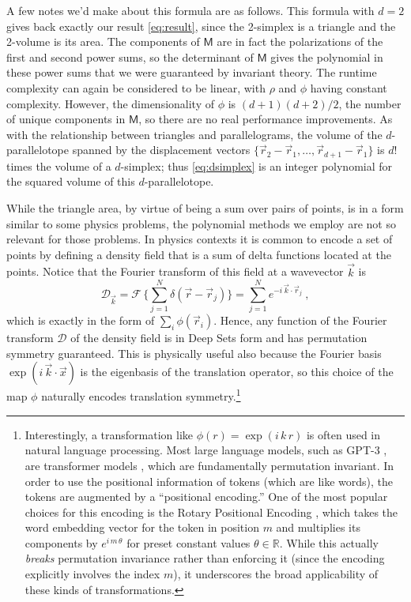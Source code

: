 \documentclass[10pt]{article}
\newcommand{\secbreak}{\bigskip{\centering\footnotesize%
\rotatebox[origin=c]{55}{$\triangle$}~~~%
\rotatebox[origin=c]{35}{$\triangle$}~~~%
\rotatebox[origin=c]{15}{$\triangle$}\par}\bigskip\noindent}
\begin{document}
A few notes we'd make about this formula are as follows.
This formula with $d=2$ gives back exactly our result \eqref{eq:result}, since the 2-simplex is a triangle and the 2-volume is its area.
The components of $\mathsf{M}$ are in fact the polarizations of the first and second power sums, so the determinant of $\mathsf{M}$ gives the polynomial in these power sums that we were guaranteed by invariant theory.
The runtime complexity can again be considered to be linear, with $\rho$ and $\phi$ having constant complexity.
However, the dimensionality of $\phi$ is $(d+1)(d+2)/2$, the number of unique components in $\mathsf{M}$, so there are no real performance improvements.
As with the relationship between triangles and parallelograms, the volume of the $d$-parallelotope spanned by the displacement vectors $\{ \vec{r}_2 - \vec{r}_1, \dots, \vec{r}_{d+1} - \vec{r}_1 \}$ is $d!$ times the volume of a $d$-simplex; thus \eqref{eq:dsimplex} is an integer polynomial for the squared volume of this $d$-parallelotope.

\secbreak
While the triangle area, by virtue of being a sum over pairs of points, is in a form similar to some physics problems, the polynomial methods we employ are not so relevant for those problems.
In physics contexts it is common to encode a set of points by defining a density field that is a sum of delta functions located at the points.
Notice that the Fourier transform of this field at a wavevector $\vec{k}$ is
\begin{equation}
    \mathcal{D}_{\vec{k}} = \mathcal{F} \,\bigg\{
        \sum_{j=1}^{N} \delta(\vec{r} - \vec{r}_j)
    \bigg\}
    = \sum_{j=1}^{N} e^{-i \, \vec{k} \cdot \vec{r}_j}~,
\end{equation}
which is exactly in the form of $\sum_i \phi(\vec{r}_i)$.
Hence, any function of the Fourier transform $\mathcal{D}$ of the density field is in Deep Sets form and has permutation symmetry guaranteed.
This is physically useful also because the Fourier basis $\exp (i\, \vec{k}\cdot\vec{x})$ is the eigenbasis of the translation operator, so this choice of the map $\phi$ naturally encodes translation symmetry.\footnote{%
    Interestingly, a transformation like $\phi(r) = \exp(i\,k\,r)$ is often used in natural language processing.
    Most large language models, such as GPT-3 \citep{Brown2020GPT3}, are transformer models \citep{Vaswani2017Attention}, which are fundamentally permutation invariant.
    In order to use the positional information of tokens (which are like words), the tokens are augmented by a ``positional encoding.''
    One of the most popular choices for this encoding is the Rotary Positional Encoding \citep[RoPE;][]{Su2024Roformer}, which takes the word embedding vector for the token in position $m$ and multiplies its components by $e^{i \, m \, \theta}$ for preset constant values $\theta \in \mathbb{R}$.
    While this actually \emph{breaks} permutation invariance rather than enforcing it (since the encoding explicitly involves the index $m$), it underscores the broad applicability of these kinds of transformations.}
\end{document}
